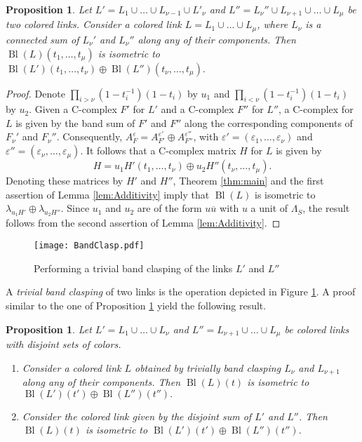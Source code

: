 \documentclass[11pt,a4paper]{amsart}
\newtheorem{proposition}[theorem]{Proposition}
\theoremstyle{definition}
\def\op{\operatorname}
\begin{document}
\begin{proposition}
\label{prop:ConnectedSum}
Let $L'=L_1 \cup \ldots \cup L_{\nu-1} \cup L'_\nu$ and $L''=L_\nu'' \cup L_{\nu+1} \cup \ldots \cup L_\mu$ be two colored links. Consider a colored link $L=L_1 \cup \ldots \cup L_\mu $, where $L_\nu$ is a connected sum of $L_\nu'$ and $L_\nu''$ along any of their components. Then $ \op{Bl}(L)(t_1,\ldots,t_\mu)$ is isometric to $\op{Bl}(L')(t_1,\ldots,t_\nu) \oplus \op{Bl}(L'')(t_\nu,\ldots,t_\mu).$
\end{proposition}
\begin{proof}
Denote $\prod_{i > \nu} (1-t_i^{-1})(1-t_i)$ by $u_1$ and $\prod_{i < \nu} (1-t_i^{-1})(1-t_i)$ by $u_2$. Given a C-complex $F'$ for $L'$ and a C-complex $F''$ for $L''$, a C-complex for $L$ is given by the band sum of $F'$ and $F''$ along the corresponding components of $F_\nu'$ and $F_\nu''$. Consequently, $A_F^\varepsilon=A^{\varepsilon'}_{F'} \oplus A^{\varepsilon''}_{F''}$, with $\varepsilon'=(\varepsilon_1,\ldots,\varepsilon_\nu)$ and $\varepsilon''=(\varepsilon_\nu,\ldots,\varepsilon_\mu)$. It follows that a C-complex matrix $H$ for $L$ is given by 
$$ H=u_1 H'(t_1,\ldots,t_\nu) \oplus u_2 H''(t_\nu,\ldots, t_\mu). $$
Denoting these matrices by $H'$ and $H''$, Theorem \ref{thm:main} and the first assertion of Lemma \ref{lem:Additivity} imply that $\op{Bl}(L)$ is isometric to $\lambda_{u_1H'}\oplus \lambda_{u_2 H''}$. Since $u_1$ and $u_2$ are of the form $u \overline{u}$ with $u$ a unit of $\Lambda_S$, the result follows from the second assertion of Lemma \ref{lem:Additivity}.
\end{proof}

\begin{figure}[!htb]
\texttt{[image: BandClasp.pdf]}
\caption{Performing a trivial band clasping of the links $L'$ and $L''$}
\label{fig:BandClasp}
\end{figure}

A \emph{trivial band clasping} of two links is the operation depicted in Figure \ref{fig:BandClasp}. A proof similar to the one of Proposition \ref{prop:ConnectedSum} yield the following result.

\begin{proposition}
\label{prop:BandClaspDisjointUnion}
Let $L'=L_1 \cup \ldots \cup L_\nu$ and $L''=L_{\nu+1} \cup \ldots \cup L_\mu$ be colored links with disjoint sets of colors.
\begin{enumerate}
\item  Consider a colored link $L$ obtained by trivially band clasping $L_\nu$ and $L_{\nu+1}$ along any of their components. Then $ \op{Bl}(L)(t)$ is isometric to $\op{Bl}(L')(t') \oplus \op{Bl}(L'')(t'').$
\item Consider the colored link given by the disjoint sum of $L'$ and $L''$. Then $\op{Bl}(L)(t)$ is isometric to $\op{Bl}(L')(t') \oplus \op{Bl}(L'')(t'')$.
\end{enumerate}
\end{proposition}
\end{document}
